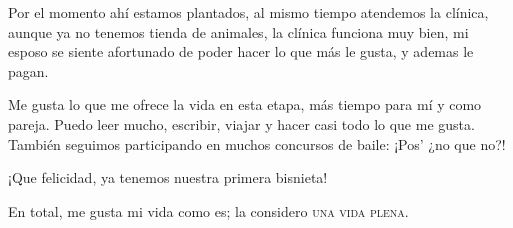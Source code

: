 \documentclass[letterpaper, 12pt]{book}
\begin{document}
Por el momento ahí estamos plantados, al mismo tiempo atendemos la clínica, aunque ya no tenemos tienda de animales, la clínica funciona muy bien, mi esposo se siente afortunado de poder hacer lo que más le gusta, y ademas le pagan.

Me gusta lo que me ofrece la vida en esta etapa, más tiempo para mí y como pareja. Puedo leer mucho, escribir, viajar y hacer casi todo lo que me gusta. También seguimos participando en muchos concursos de baile: ¡Pos' ¿no que no?!

¡Que felicidad, ya tenemos nuestra primera bisnieta!

En total, me gusta mi vida como es; la  considero \textsc{una vida plena}.
\end{document}
